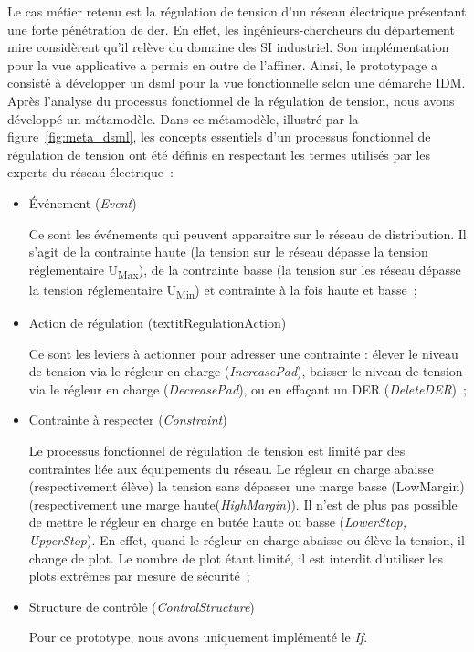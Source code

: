 		Le cas métier retenu est la régulation de tension d'un réseau électrique présentant une forte pénétration de \gls{der}. En effet, les ingénieurs-chercheurs du département \gls{mire} considèrent qu'il relève du domaine des SI industriel. Son implémentation pour la vue applicative a permis en outre de l'affiner. 
		Ainsi, le prototypage a consisté à développer un \gls{dsml} pour la vue fonctionnelle selon une démarche IDM. Après l'analyse du processus fonctionnel de la régulation de tension, nous avons développé un métamodèle. Dans ce métamodèle, illustré par la figure~\ref{fig:meta_dsml}, les concepts essentiels d'un processus fonctionnel de régulation de tension ont été définis en respectant les termes utilisés par les experts du réseau électrique~:
		
		\begin{itemize}
		
\item Événement (\textit{Event})

Ce sont les événements qui peuvent apparaitre sur le réseau de distribution. Il
s'agit de la contrainte haute (la tension sur le réseau dépasse la tension
réglementaire U\textsubscript{Max}), de la contrainte basse (la tension sur les
réseau dépasse la tension réglementaire U\textsubscript{Min}) et contrainte à la
fois haute et basse~;

\item Action de régulation (textit{RegulationAction})

Ce sont les leviers à actionner pour adresser une contrainte : élever le niveau
de tension via le régleur en charge (\textit{IncreasePad}), baisser le niveau de
tension via le régleur en charge (\textit{DecreasePad}), ou en effaçant un DER
(\textit{DeleteDER})~;

\item Contrainte à respecter (\textit{Constraint})

Le processus fonctionnel de régulation de tension est limité par des contraintes
liée aux équipements du réseau. Le régleur en charge abaisse (respectivement
élève) la tension sans dépasser une marge basse (LowMargin) (respectivement une
marge haute(\textit{HighMargin})). Il n'est de plus pas possible de mettre le
régleur en charge en butée haute ou basse (\textit{LowerStop, UpperStop}). En
effet, quand le régleur en charge abaisse ou élève la tension, il change de
plot. Le nombre de plot étant limité, il est interdit d'utiliser les plots
extrêmes par mesure de sécurité~;

\item Structure de contrôle (\textit{ControlStructure})

Pour ce prototype, nous avons uniquement implémenté le \textit{If}. 

		\end{itemize}
		
